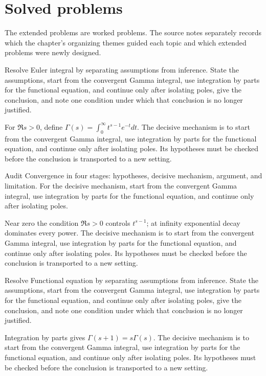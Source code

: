 \section{Solved problems}
The extended problems are worked problems. The source notes separately records which the chapter's organizing themes guided each topic and which extended problems were newly designed.

\begin{problem}\label{prob:iv19-problem-01}
Resolve Euler integral by separating assumptions from inference. State the assumptions, start from the convergent Gamma integral, use integration by parts for the functional equation, and continue only after isolating poles, give the conclusion, and note one condition under which that conclusion is no longer justified.
\end{problem}
\begin{solution}
For $\Re s>0$, define $\Gamma(s)=\int_0^\infty t^{s-1}e^{-t}dt$. The decisive mechanism is to start from the convergent Gamma integral, use integration by parts for the functional equation, and continue only after isolating poles. Its hypotheses must be checked before the conclusion is transported to a new setting.
\end{solution}

\begin{problem}\label{prob:iv19-problem-02}
Audit Convergence in four stages: hypotheses, decisive mechanism, argument, and limitation. For the decisive mechanism, start from the convergent Gamma integral, use integration by parts for the functional equation, and continue only after isolating poles.
\end{problem}
\begin{solution}
Near zero the condition $\Re s>0$ controls $t^{s-1}$; at infinity exponential decay dominates every power. The decisive mechanism is to start from the convergent Gamma integral, use integration by parts for the functional equation, and continue only after isolating poles. Its hypotheses must be checked before the conclusion is transported to a new setting.
\end{solution}

\begin{problem}\label{prob:iv19-problem-03}
Resolve Functional equation by separating assumptions from inference. State the assumptions, start from the convergent Gamma integral, use integration by parts for the functional equation, and continue only after isolating poles, give the conclusion, and note one condition under which that conclusion is no longer justified.
\end{problem}
\begin{solution}
Integration by parts gives $\Gamma(s+1)=s\Gamma(s)$. The decisive mechanism is to start from the convergent Gamma integral, use integration by parts for the functional equation, and continue only after isolating poles. Its hypotheses must be checked before the conclusion is transported to a new setting.
\end{solution}

